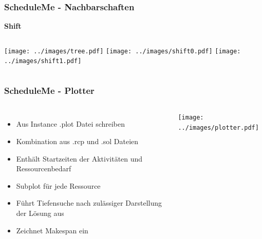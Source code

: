 \documentclass[aspectratio=169]{beamer}
\begin{document}

\begin{frame}
\frametitle{ScheduleMe - Nachbarschaften}
\textbf{Shift}
\begin{columns}[c] %
	\texttt{[image: ../images/tree.pdf]}	
	\texttt{[image: ../images/shift0.pdf]}
	\texttt{[image: ../images/shift1.pdf]}	
\end{columns}
\end{frame}


\begin{frame}
\frametitle{ScheduleMe - Plotter}
\begin{columns}[c] %
	
	\begin{itemize}
		\item Aus Instance .plot Datei schreiben
		\item Kombination aus .rcp und .sol Dateien
		\item Enthält Startzeiten der Aktivitäten und Ressourcenbedarf
		\item Subplot für jede Ressource
		\item Führt Tiefensuche nach zulässiger Darstellung der Lösung aus
		\item Zeichnet Makespan ein
	\end{itemize}
	\texttt{[image: ../images/plotter.pdf]}		
\end{columns}
\end{frame}

\end{document}
